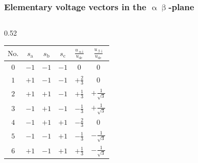 \begin{frame}[b]
    \frametitle{Elementary voltage vectors in the $\upalpha\upbeta$-plane}
    \vspace{0.3em}
    \begin{columns}[T,onlytextwidth]
        \begin{column}{0.52\textwidth}
            \begin{table}
                \setlength{\tabcolsep}{4pt}
                \renewcommand{\arraystretch}{1.2}
                \centering
                \begin{tabular}{c c c c c c}
                    \toprule
                    $\mathrm{No.}$ & $s_\mathrm{a}$ & $s_\mathrm{b}$ & $s_\mathrm{c}$ & $\frac{u_{\mathrm{\upalpha i}}}{u_\mathrm{dc}}$ & $\frac{u_{\mathrm{\upbeta i}}}{u_\mathrm{dc}}$ \\
                    \midrule
                    $0$            & $-1$           & $-1$           & $-1$           & $0$                                             & $0$                                            \\
                    $1$            & $+1$           & $-1$           & $-1$           & $+\frac{2}{3}$                                  & $0$                                            \\
                    $2$            & $+1$           & $+1$           & $-1$           & $+\frac{1}{3}$                                  & $+\frac{1}{\sqrt{3}}$                          \\
                    $3$            & $-1$           & $+1$           & $-1$           & $-\frac{1}{3}$                                  & $+\frac{1}{\sqrt{3}}$                          \\
                    $4$            & $-1$           & $+1$           & $+1$           & $-\frac{2}{3}$                                  & $0$                                            \\
                    $5$            & $-1$           & $-1$           & $+1$           & $-\frac{1}{3}$                                  & $-\frac{1}{\sqrt{3}}$                          \\
                    $6$            & $+1$           & $-1$           & $+1$           & $+\frac{1}{3}$                                  & $-\frac{1}{\sqrt{3}}$                          \\

\end{tabular}
\end{table}
\end{column}
\end{columns}
\end{frame}
